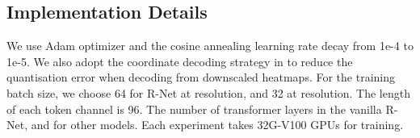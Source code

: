\documentclass{article}
\begin{document}
\subsection{Implementation Details}
We use Adam optimizer and the cosine annealing learning rate decay from 1e-4 to 1e-5. We also adopt the coordinate decoding strategy in \cite{zhang2020distribution} to reduce the quantisation error when decoding from downscaled heatmaps. For the training batch size, we choose 64 for R-Net at   resolution, and 32 at  resolution. The length of each token channel  is 96. The number of transformer layers  in the vanilla R-Net, and  for other models. Each experiment takes  32G-V100 GPUs for training.




\begin{table}[htp]
\centering
\Large
{}
\end{table}
\end{document}
